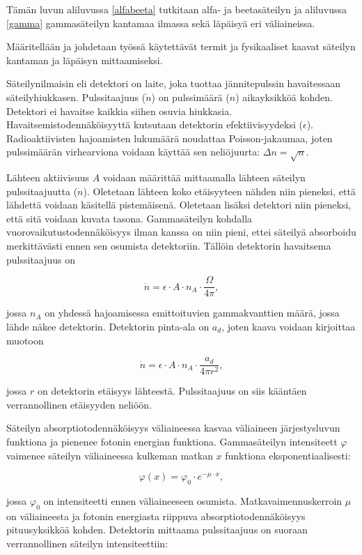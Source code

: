 \documentclass[a4paper,11pt]{article}
\begin{document}
Tämän luvun aliluvussa \ref{alfabeeta} tutkitaan alfa- ja beetasäteilyn ja aliluvussa \ref{gamma} gammasäteilyn kantamaa ilmassa sekä läpäisyä eri väliaineissa. 

Määritellään ja johdetaan työssä käytettävät termit ja fysikaaliset kaavat säteilyn kantaman ja läpäisyn mittaamiseksi. 

Säteilynilmaisin eli detektori on laite, joka tuottaa jännitepulssin havaitessaan säteilyhiukkasen. Pulssitaajuus ($\dot{n}$) on pulssimäärä ($n$) aikayksikköä kohden. Detektori ei havaitse kaikkia siihen osuvia hiukkasia. Havaitsemistodennäköisyyttä kutsutaan detektorin efektiivisyydeksi ($\epsilon$). Radioaktiivisten hajoamisten lukumäärä noudattaa Poisson-jakaumaa, joten pulssimäärän virhearviona voidaan käyttää sen neliöjuurta: $\Delta n = \sqrt{n}$.

Lähteen aktiivisuus $A$ voidaan määrittää mittaamalla lähteen säteilyn pulssitaajuutta ($\dot{n}$). Oletetaan lähteen koko etäisyyteen nähden niin pieneksi, että lähdettä voidaan käsitellä pistemäisenä. Oletetaan lisäksi detektori niin pieneksi, että sitä voidaan kuvata tasona. Gammasäteilyn kohdalla vuorovaikutustodennäköisyys ilman kanssa on niin pieni, ettei säteilyä absorboidu merkittävästi ennen sen osumista detektoriin. Tällöin detektorin havaitsema pulssitaajuus on 

\[ \dot{n} = \epsilon \cdot A \cdot n_A \cdot \frac{\Omega}{4 \pi} ,\]

jossa $n_A$ on yhdessä hajoamisessa emittoituvien gammakvanttien määrä, jossa lähde näkee detektorin. Detektorin pinta-ala on $a_d$, joten kaava voidaan kirjoittaa muotoon

\[ \dot{n} = \epsilon \cdot A \cdot n_A \cdot \frac{a_d}{4 \pi r^2} ,\]

jossa $r$ on detektorin etäisyys lähteestä. Pulssitaajuus on siis kääntäen verrannollinen etäisyyden neliöön. 

Säteilyn absorptiotodennäköisyys väliaineessa kasvaa väliaineen järjestysluvun funktiona ja pienenee fotonin energian funktiona. Gammasäteilyn intensiteett $\varphi$ vaimenee säteilyn väliaineessa kulkeman matkan $x$ funktiona eksponentiaalisesti:

\[ \varphi(x) = \varphi_0 \cdot e^{-\mu \cdot x} ,\]

jossa $\varphi_0$ on intensiteetti ennen väliaineeseen osumista. Matkavaimennuskerroin $\mu$ on väliaineesta ja fotonin energiasta riippuva absorptiotodennäköisyys pituusyksikköä kohden. Detektorin mittaama pulssitaajuus on suoraan verrannollinen säteilyn intensiteettiin: 
\end{document}
